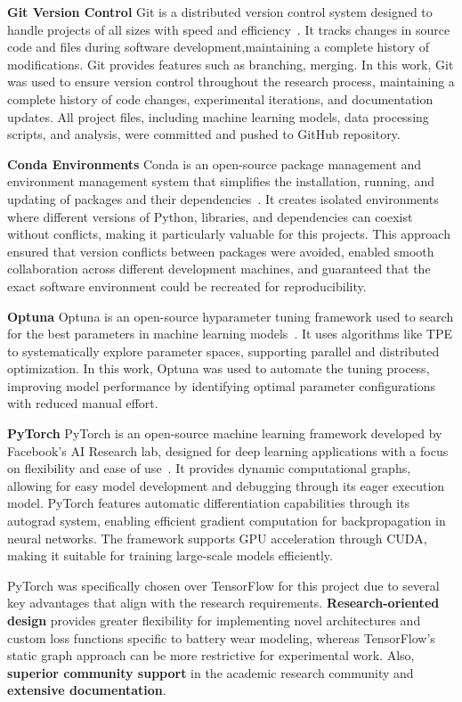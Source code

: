 \textbf{Git Version Control}
Git is a distributed version control system designed to handle projects of all sizes with speed and efficiency~\cite{noauthor_git_nodate}. It tracks changes in source code and files during software development,maintaining a complete history of modifications. Git provides features such as branching, merging. In this work, Git was used to ensure version control throughout the research process, maintaining a complete history of code changes, experimental iterations, and documentation updates. All project files, including machine learning models, data processing scripts, and analysis, were committed and pushed to GitHub repository.

\textbf{Conda Environments}
Conda is an open-source package management and environment management system that simplifies the installation, running, and updating of packages and 
their dependencies~\cite{conda_contributors_conda_2025}. It creates isolated environments where different versions of Python, libraries, 
and dependencies can coexist without conflicts, making it particularly valuable for this projects. This approach ensured that version conflicts between packages were avoided, enabled smooth collaboration across different 
development machines, and guaranteed that the exact software environment could be recreated for reproducibility.

\textbf{Optuna}
\label{subsec:optuna}
Optuna is an open-source hyparameter tuning framework used to search for the best parameters in machine learning models~\cite{akiba_optuna_2019}. It uses algorithms like TPE to systematically explore parameter spaces, supporting parallel and distributed optimization. In this work, Optuna was used to automate the tuning process, improving model performance by identifying optimal parameter configurations with reduced manual effort.

\textbf{PyTorch}
PyTorch is an open-source machine learning framework developed by Facebook's AI Research lab, designed for deep learning applications with a 
focus on flexibility and ease of use~\cite{ansel_pytorch_2024}. It provides dynamic computational graphs, 
allowing for easy model development and debugging through its eager execution model. PyTorch features 
automatic differentiation capabilities through its autograd system, enabling efficient gradient computation 
for backpropagation in neural networks. The framework supports GPU acceleration through CUDA, making it suitable
for training large-scale models efficiently. 

PyTorch was specifically chosen over TensorFlow for this project due to several key advantages that align with the research requirements. \textbf{Research-oriented design} provides greater flexibility for implementing novel architectures and custom loss functions specific to battery wear modeling, whereas TensorFlow's static graph approach can be more restrictive for experimental work. Also, \textbf{superior community support} in the academic research community and \textbf{extensive documentation}.

